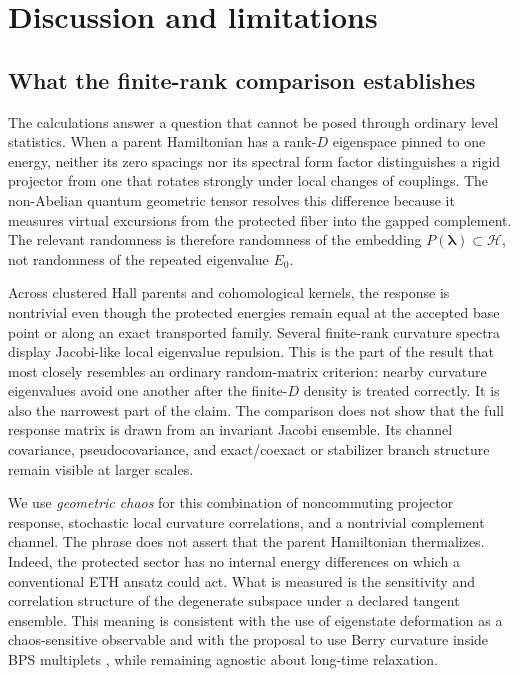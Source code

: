 \section{Discussion and limitations}
\label{sec:discussion}

\subsection{What the finite-rank comparison establishes}

The calculations answer a question that cannot be posed through ordinary
level statistics.  When a parent Hamiltonian has a rank-$D$ eigenspace pinned
to one energy, neither its zero spacings nor its spectral form factor
distinguishes a rigid projector from one that rotates strongly under local
changes of couplings.  The non-Abelian quantum geometric tensor resolves this
difference because it measures virtual excursions from the protected fiber
into the gapped complement.  The relevant randomness is therefore randomness
of the embedding $P(\boldsymbol\lambda)\subset\mathcal H$, not randomness of
the repeated eigenvalue $E_0$.

Across clustered Hall parents and cohomological kernels, the response is
nontrivial even though the protected energies remain equal at the accepted
base point or along an exact transported family.  Several finite-rank
curvature spectra display Jacobi-like local eigenvalue repulsion.  This is the
part of the result that most closely resembles an ordinary random-matrix
criterion: nearby curvature eigenvalues avoid one another after the
finite-$D$ density is treated correctly.  It is also the narrowest part of the
claim.  The comparison does not show that the full response matrix is drawn
from an invariant Jacobi ensemble.  Its channel covariance, pseudocovariance,
and exact/coexact or stabilizer branch structure remain visible at larger
scales.

We use \emph{geometric chaos} for this combination of noncommuting projector
response, stochastic local curvature correlations, and a nontrivial
complement channel.  The phrase does not assert that the parent Hamiltonian
thermalizes.  Indeed, the protected sector has no internal energy differences
on which a conventional ETH ansatz could act.  What is measured is the
sensitivity and correlation structure of the degenerate subspace under a
declared tangent ensemble.  This meaning is consistent with the use of
eigenstate deformation as a chaos-sensitive observable \cite{pandey2020} and
with the proposal to use Berry curvature inside BPS multiplets
\cite{chen2026}, while remaining agnostic about long-time relaxation.

